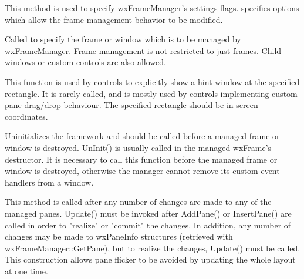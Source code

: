 \label{wxframemanagersetflags}


This method is used to specify wxFrameManager's settings flags. 
specifies options which allow the frame management behavior to be modified.

\label{wxframemanagersetmanagedwindow}


Called to specify the frame or window which is to be managed by wxFrameManager.  Frame management is not restricted to just frames.  Child windows or custom controls are also allowed.

\label{wxframemanagershowhint}


This function is used by controls to explicitly show a hint window at the specified rectangle.  It is rarely called, and is mostly used by controls implementing custom pane drag/drop behaviour.  The specified rectangle should be in screen coordinates.

\label{wxframemanageruninit}


Uninitializes the framework and should be called before a managed frame or window is destroyed. UnInit() is usually called in the managed wxFrame's destructor.  It is necessary to call this function before the managed frame or window is destroyed, otherwise the manager cannot remove its custom event handlers from a window.

\label{wxframemanagerupdate}


This method is called after any number of changes are
made to any of the managed panes. Update() must be invoked after
AddPane() or InsertPane() are called in order to "realize" or "commit"
the changes. In addition, any number of changes may be made to
wxPaneInfo structures (retrieved with wxFrameManager::GetPane), but to
realize the changes, Update() must be called. This construction allows
pane flicker to be avoided by updating the whole layout at one time.

